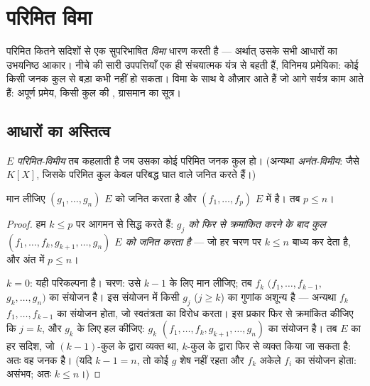 \chapter{परिमित विमा}\label{ch:b1:findim}

परिमित कितने सदिशों से  एक सुपरिभाषित \emph{विमा} धारण करती है
--- अर्थात् उसके सभी आधारों का उभयनिष्ठ आकार। नीचे की सारी उपपत्तियाँ एक ही
संचयात्मक यंत्र से बहती हैं, विनिमय प्रमेयिका: कोई  किसी जनक कुल
से बड़ा कभी नहीं हो सकता। विमा के साथ वे औज़ार आते हैं जो आगे सर्वत्र काम
आते हैं: अपूर्ण  प्रमेय, किसी कुल की , ग्रासमान का सूत्र।

\section{आधारों का अस्तित्व}

\begin{definition}\label{def:b1:findim:def}
$E$ \emph{परिमित-विमीय} तब कहलाती है जब उसका कोई परिमित
जनक कुल हो। (अन्यथा \emph{अनंत-विमीय}: जैसे $K[X]$, जिसके परिमित कुल केवल
परिबद्ध घात वाले  जनित करते हैं।)
\end{definition}

\begin{theorem}[विनिमय प्रमेयिका]\label{thm:b1:findim:exchange}
मान लीजिए $(g_1, \dots, g_n)$ $E$ को जनित करता है और $(f_1, \dots, f_p)$ $E$
में  है। तब $p \leq n$।
\end{theorem}

\begin{proof}
हम $k \leq p$ पर आगमन से सिद्ध करते हैं: \emph{$g_j$ को फिर से क्रमांकित
करने के बाद कुल $(f_1, \dots, f_k, g_{k+1}, \dots, g_n)$ $E$ को जनित करता
है} --- जो हर चरण पर $k \leq n$ बाध्य कर देता है, और अंत में $p \leq n$।

$k = 0$: यही परिकल्पना है। चरण: उसे $k - 1$ के लिए मान लीजिए; तब $f_k$
$(f_1, \dots, f_{k-1},$ $g_k, \dots, g_n)$ का संयोजन है। इस संयोजन में किसी
$g_j$ ($j \geq k$) का गुणांक अशून्य है --- अन्यथा $f_k$ $f_1, \dots,
f_{k-1}$ का संयोजन होता, जो स्वतंत्रता का विरोध करता। इस प्रकार फिर से
क्रमांकित कीजिए कि $j = k$, और $g_k$ के लिए हल कीजिए: $g_k$ $(f_1, \dots,
f_k, g_{k+1}, \dots, g_n)$ का संयोजन है। तब $E$ का हर सदिश, जो $(k-1)$-कुल
के द्वारा व्यक्त था, $k$-कुल के द्वारा फिर से व्यक्त किया जा सकता है: अतः वह
जनक है। (यदि $k - 1 = n$, तो कोई $g$ शेष नहीं रहता और $f_k$ अकेले $f_i$ का
संयोजन होता: असंभव; अतः $k \leq n$।)
\end{proof}

